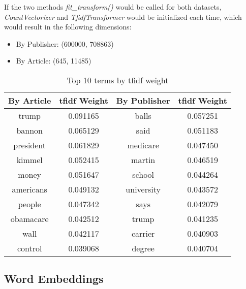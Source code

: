 \documentclass[a4paper, 11pt,titlepage,oneside,openany]{book}
\begin{document}
\noindent If the two methods \textit{fit\_transform()} would be called for both datasets, \textit{CountVectorizer} and \textit{TfidfTransformer} would be initialized each time, which would result in the following dimensions:
\begin{itemize}
	\item By Publisher: (600000, 708863)
	\item By Article: (645, 11485)	
\end{itemize}
\begin{table}
	\scriptsize
	\centering
			\begin{tabular}{cc|cc}
				\toprule
				By Article & \Gls{tfidf} Weight & By Publisher & \Gls{tfidf} Weight \\
				\midrule
				trump & 0.091165 & balls & 0.057251\\
				bannon & 0.065129 & said & 0.051183 \\
				president & 0.061829 & medicare & 0.047450 \\
				kimmel & 0.052415 & martin & 0.046519 \\
				money & 0.051647 & school & 0.044264\\
				americans & 0.049132 & university & 0.043572\\
				people & 0.047342 & says & 0.042079 \\
				obamacare & 0.042512 & trump & 0.041235\\
				wall & 0.042117 & carrier & 0.040903\\
				control & 0.039068 & degree & 0.040704\\
				\bottomrule
			\end{tabular}
		\caption{Top 10 terms by \Gls{tfidf} weight}
\end{table}

\subsection{Word Embeddings}
\end{document}
